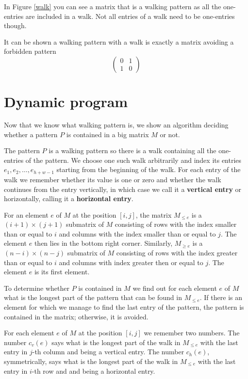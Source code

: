 In Figure \ref{walk} you can see a matrix that is a walking pattern as all the one-entries are included in a walk. Not all entries of a walk need to be one-entries though.

It can be shown a walking pattern with a walk is exactly a matrix avoiding a forbidden pattern
$$\left(\begin{array}{cc}
0 & 1 \\
1 & 0
\end{array}\right)$$

\section{Dynamic program}
Now that we know what walking pattern is, we show an algorithm deciding whether a pattern $P$ is contained in a big matrix $M$ or not.

The pattern $P$ is a walking pattern so there is a walk containing all the one-entries of the pattern. We choose one such walk arbitrarily and index its entries $e_1,e_2,\dots,e_{h+w-1}$ starting from the beginning of the walk. For each entry of the walk we remember whether its value is one or zero and whether the walk continues from the entry vertically, in which case we call it a \textbf{vertical entry} or horizontally, calling it a \textbf{horizontal entry}.

For an element $e$ of $M$ at the position $[i,j]$, the matrix $M_{\leq e}$ is a $(i+1)\times(j+1)$ submatrix of $M$ consisting of rows with the index smaller than or equal to $i$ and columns with the index smaller than or equal to $j$. The element $e$ then lies in the bottom right corner. Similarly, $M_{\geq e}$ is a $(n-i)\times(n-j)$ submatrix of $M$ consisting of rows with the index greater than or equal to $i$ and columns with index greater then or equal to $j$. The element $e$ is its first element.

To determine whether $P$ is contained in $M$ we find out for each element $e$ of $M$ what is the longest part of the pattern that can be found in $M_{\leq e}$. If there is an element for which we manage to find the last entry of the pattern, the pattern is contained in the matrix; otherwise, it is avoided.

For each element $e$ of $M$ at the position $[i,j]$ we remember two numbers. The number $c_v(e)$ says what is the longest part of the walk in $M_{\leq e}$ with the last entry in $j$-th column and being a vertical entry. The number $c_h(e)$, symmetrically, says what is the longest part of the walk in $M_{\leq e}$ with the last entry in $i$-th row and and being a horizontal entry.

